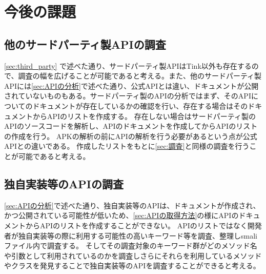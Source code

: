 \newpage
\section{今後の課題}
\subsection{他のサードパーティ製APIの調査}
\ref{sec:third_party}	で述べた通り、サードパーティ製APIはTink以外も存在するので、調査の幅を広げることが可能であると考える。また、他のサードパーティ製APIには\ref{sec:APIの分析}で述べた通り、公式APIとは違い、ドキュメントが公開されていないものもある。サードパーティ製のAPIの分析ではまず、そのAPIについてのドキュメントが存在しているかの確認を行い、存在する場合はそのドキュメントからAPIのリストを作成する。
存在しない場合はサードパーティ製のAPIのソースコードを解析し、APIのドキュメントを作成してからAPIのリストの作成を行う。
APKの解析の前にAPIの解析を行う必要があるという点が公式APIとの違いである。
作成したリストをもとに\ref{sec:調査}と同様の調査を行うことが可能であると考える。
\subsection{独自実装等のAPIの調査}
\ref{sec:APIの分析}で述べた通り、独自実装等のAPIは、ドキュメントが作成され、かつ公開されている可能性が低いため、\ref{sec:APIの取得方法}の様にAPIのドキュメントからAPIのリストを作成することができない。
APIのリストではなく開発者が独自実装等の際に利用する可能性の高いキーワード等を調査、整理しsmaliファイル内で調査する。
そしてその調査対象のキーワード群がどのメソッド名や引数として利用されているのかを調査しさらにそれらを利用しているメソッドやクラスを発見することで独自実装等のAPIを調査することができると考える。